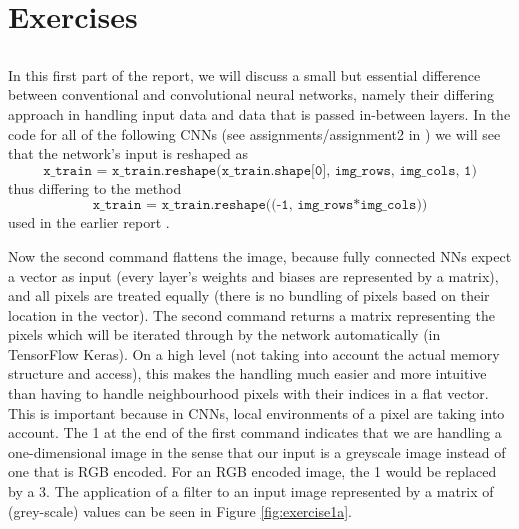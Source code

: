 \documentclass[12pt]{article}
\begin{document}
\newpage
\section{Exercises}
\subsection{}\label{sec:exercise1a}

In this first part of the report, we will discuss a small but essential difference between conventional and convolutional neural networks, namely their differing approach in handling input data and data that is passed in-between layers. In the code for all of the following CNNs (see assignments/assignment2 in \cite{JGitHub}) we will see that the network's input is reshaped as 
$$ \texttt{x\_train = x\_train.reshape(x\_train.shape[0], img\_rows, img\_cols, 1)
}$$ 
thus differing to the method 
$$ \texttt{x\_train = x\_train.reshape((-1, img\_rows*img\_cols))} $$ 
used in the earlier report \cite{JG}. 

Now the second command flattens the image, because fully connected NNs expect a vector as input (every layer's weights and biases are represented by a matrix), and all pixels are treated equally (there is no bundling of pixels based on their location in the vector). The second command returns a matrix representing the pixels which will be iterated through by the network automatically (in TensorFlow Keras). On a high level (not taking into account the actual memory structure and access), this makes the handling much easier and more intuitive than having to handle neighbourhood pixels with their indices in a flat vector. This is important because in CNNs, local environments of a pixel are taking into account. The 1 at the end of the first command indicates that we are handling a one-dimensional image in the sense that our input is a greyscale image instead of one that is RGB encoded. For an RGB encoded image, the 1 would be replaced by a 3. The application of a filter to an input image represented by a matrix of (grey-scale) values can be seen in Figure \ref{fig:exercise1a}.
\end{document}
